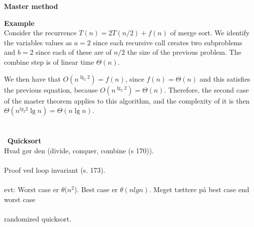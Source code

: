 \documentclass[12pt]{article}
\begin{document}
\textbf{Master method}


\noindent \textbf{Example} \\
Consider the recurrence $T(n) = 2T(n/2) + f(n)$ of merge sort. We identify the
variables values as $a = 2$ since each recursive call creates two subproblems
and $b = 2$ since each of these are of $n/2$ the size of the previous problem.
The combine step is of linear time $\Theta(n)$.

We then have that $O(n^{\lg_2 2}) = f(n)$, since $f(n) = \Theta(n)$ and this
satisfies the previous equation, because $O(n^{\lg_2 2}) = \Theta(n)$.
Therefore, the second case of the master theorem applies to this algorithm,
and the complexity of it is then $\Theta(n^{lg_2 2}\lg n) = \Theta(n \lg n)$.
\\\\\\\
\textbf{Quicksort}\\
Hvad gør den (divide, conquer, combine (s 170)).\\
\\
Proof ved loop invariant (s. 173).\\
\\
evt: Worst case er $\theta (n^2$). Best case er $\theta(n lg n)$. Meget tættere på best case end worst case\\
\\
randomized quicksort.
\end{document}
